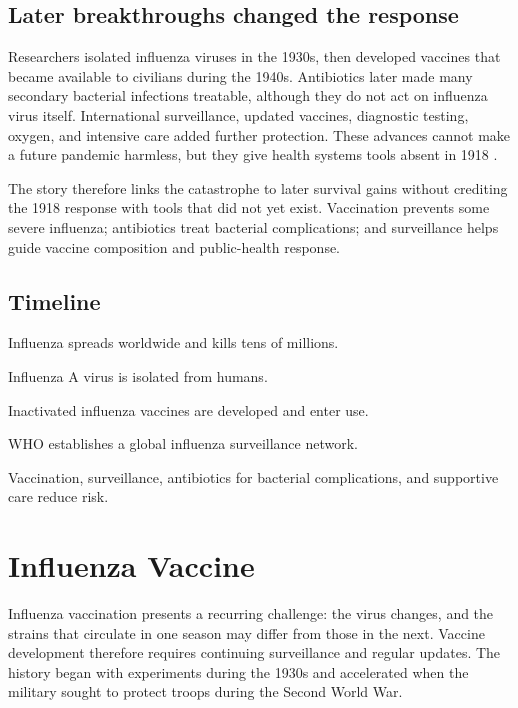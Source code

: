 \documentclass[12pt,oneside]{book}
\begin{document}
\section{Later breakthroughs changed the response}
Researchers isolated influenza viruses in the 1930s, then developed vaccines
that became available to civilians during the 1940s. Antibiotics later made
many secondary bacterial infections treatable, although they do not act on
influenza virus itself. International surveillance, updated vaccines,
diagnostic testing, oxygen, and intensive care added further protection.
These advances cannot make a future pandemic harmless, but they give health
systems tools absent in 1918 \cite{cdc1918Influenza,cdcInfluenzaTimeline}.

The story therefore links the catastrophe to later survival gains without
crediting the 1918 response with tools that did not yet exist. Vaccination
prevents some severe influenza; antibiotics treat bacterial complications;
and surveillance helps guide vaccine composition and public-health response.

\section*{Timeline}
\begin{description}[leftmargin=2.3cm,style=nextline]
  \item[1918--1920] Influenza spreads worldwide and kills tens of millions.
  \item[1933] Influenza A virus is isolated from humans.
  \item[1940s] Inactivated influenza vaccines are developed and enter use.
  \item[1952] WHO establishes a global influenza surveillance network.
  \item[Today] Vaccination, surveillance, antibiotics for bacterial complications, and supportive care reduce risk.
\end{description}

\chapter[Influenza Vaccine]{Influenza Vaccine}

Influenza vaccination presents a recurring challenge: the virus changes, and
the strains that circulate in one season may differ from those in the next.
Vaccine development therefore requires continuing surveillance and regular
updates. The history began with experiments during the 1930s and accelerated
when the military sought to protect troops during the Second World War.
\end{document}
